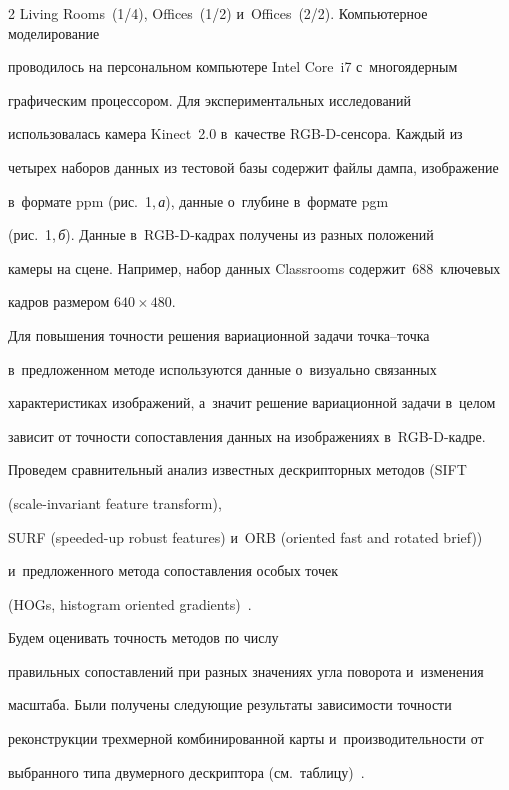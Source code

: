 \begin{multicols}{2}
Living Rooms~(1/4), Offices~(1/2) и~Offices~(2/2). Компьютерное моделирование 

проводилось на персональном компьютере Intel Core~i7 с~многоядерным 

графическим процессором. Для экспериментальных исследований 

использовалась камера Kinect~2.0 в~качестве RGB-D-сен\-со\-ра. Каждый из 

четырех наборов данных из тестовой базы содержит файлы дампа, изображение 

в~формате ppm (рис.~1,\,\textit{а}), данные о~глубине в~формате pgm 

(рис.~1,\,\textit{б}). Данные в~RGB-D-кад\-рах получены из разных положений 

камеры на сцене. Например, набор данных Classrooms содержит~688~ключевых 

кад\-ров размером $640\times 480$.

  



  

  Для повышения точности решения вариационной задачи точка--точка 

в~предложенном методе используются данные о~визуально связанных 

характеристиках изображений, а~значит решение вариационной задачи в~целом 

зависит от точности сопоставления данных на изображениях в~RGB-D-кад\-ре. 

Проведем сравнительный анализ известных дескрипторных методов (SIFT

(scale-invariant feature transform), 

SURF (speeded-up robust features) и~ORB (oriented fast and rotated brief)) 

и~предложенного метода со\-по\-став\-ле\-ния особых точек 

(HOGs, histogram oriented gradients)~\cite{15-voh, 16-voh}. 



Будем оценивать точность методов по чис\-лу 

правильных сопоставлений при разных значениях угла поворота и~изменения 

мас\-шта\-ба. Были получены следующие результаты зависимости точности 

реконструкции трехмерной комбинированной карты и~производительности от 

выбранного типа двумерного дескриптора (см.\ таб\-ли\-цу)~\cite{20-voh}. 


\end{multicols}
